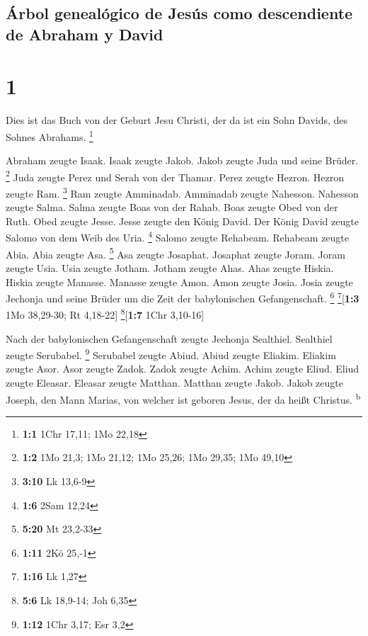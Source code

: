 \hypertarget{uxe1rbol-genealuxf3gico-de-jesuxfas-como-descendiente-de-abraham-y-david}{%
\subsection{Árbol genealógico de Jesús como descendiente de Abraham y
David}\label{uxe1rbol-genealuxf3gico-de-jesuxfas-como-descendiente-de-abraham-y-david}}

\hypertarget{section}{%
\section{1}\label{section}}

 Dies ist das Buch von der Geburt Jesu Christi, der da ist
ein Sohn Davids, des Sohnes Abrahams. \footnote{\textbf{1:1} 1Chr 17,11;
  1Mo 22,18}

 Abraham zeugte Isaak. Isaak zeugte Jakob. Jakob zeugte
Juda und seine Brüder. \footnote{\textbf{1:2} 1Mo 21,3; 1Mo 21,12; 1Mo
  25,26; 1Mo 29,35; 1Mo 49,10}  Juda zeugte Perez und
Serah von der Thamar. Perez zeugte Hezron. Hezron zeugte Ram.
\footnote{\textbf{3:10} Lk 13,6-9}  Ram zeugte Amminadab.
Amminadab zeugte Nahesson. Nahesson zeugte Salma.  Salma
zeugte Boas von der Rahab. Boas zeugte Obed von der Ruth. Obed zeugte
Jesse.  Jesse zeugte den König David. Der König David
zeugte Salomo von dem Weib des Uria. \footnote{\textbf{1:6} 2Sam 12,24}
 Salomo zeugte Rehabeam. Rehabeam zeugte Abia. Abia zeugte
Asa. \footnote{\textbf{5:20} Mt 23,2-33}  Asa zeugte
Josaphat. Josaphat zeugte Joram. Joram zeugte Usia.  Usia
zeugte Jotham. Jotham zeugte Ahas. Ahas zeugte Hiskia. 
Hiskia zeugte Manasse. Manasse zeugte Amon. Amon zeugte Josia.
 Josia zeugte Jechonja und seine Brüder um die Zeit der
babylonischen Gefangenschaft. \footnote{\textbf{1:11} 2Kö 25,-1}
\footnote{\textbf{1:16} Lk 1,27}{[}\textbf{1:3} 1Mo 38,29-30; Rt
4,18-22{]} \footnote{\textbf{5:6} Lk 18,9-14; Joh 6,35}{[}\textbf{1:7}
1Chr 3,10-16{]}

 Nach der babylonischen Gefangenschaft zeugte Jechonja
Sealthiel. Sealthiel zeugte Serubabel. \footnote{\textbf{1:12} 1Chr
  3,17; Esr 3,2}  Serubabel zeugte Abiud. Abiud zeugte
Eliakim. Eliakim zeugte Asor.  Asor zeugte Zadok. Zadok
zeugte Achim. Achim zeugte Eliud.  Eliud zeugte Eleasar.
Eleasar zeugte Matthan. Matthan zeugte Jakob.  Jakob
zeugte Joseph, den Mann Marias, von welcher ist geboren Jesus, der da
heißt Christus. \textsuperscript{b}

